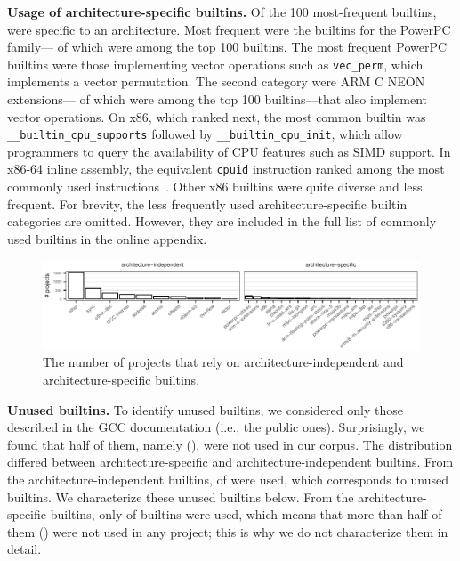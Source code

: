 \documentclass[sigconf,screen]{acmart}
\renewcommand{\paragraph}[1]{\textbf{#1}}
\newcommand\code[1]{\texttt{#1}}
\begin{document}
\paragraph{Usage of architecture-specific builtins.}
\sloppy
Of the 100 most-frequent builtins, \topMachineSpecificBuiltins{} were specific to an architecture.
Most frequent were the builtins for the PowerPC family---\topPowerpcAltivecBuiltins{} of which were among the top 100 builtins.
The most frequent PowerPC builtins were those implementing vector operations such as \code{vec\_perm}, which implements a vector permutation.
The second category were ARM C NEON extensions---\topArmCBuiltins{} of which were among the top 100 builtins---that also implement vector operations.
On x86, which ranked next, the most common builtin was \code{\_\_builtin\_cpu\_supports} followed by \code{\_\_builtin\_cpu\_init}, which allow programmers to query the availability of CPU features such as SIMD support.
In x86-64 inline assembly, the equivalent \code{cpuid} instruction ranked among the most commonly used instructions~\cite{inlineassembly}.
Other x86 builtins were quite diverse and less frequent.
For brevity, the less frequently used architecture-specific builtin categories are omitted. However, they are included in the full list of commonly used builtins in the online appendix.

\begin{figure}[tb]
    \centering
    \includegraphics[width=\textwidth]{../generated/plots/platform-dependent-and-independent-in-projects.pdf}
    \caption{The number of projects that rely on architecture-independent and architecture-specific builtins.}
    \label{img:builtinsbarplots}
\end{figure}


\paragraph{Unused builtins.}
To identify unused builtins, we considered only those described in the GCC documentation (i.e., the public ones).
Surprisingly, we found that half of them, namely \numberDefBuiltinsNotUsed{} (\percentageDefBuiltinsNotUsed{}), were not used in our corpus.
The distribution differed between architecture-specific and architecture-independent builtins.
From the architecture-independent builtins, \nrMachineIndependentBuiltinsUsed{} of \nrArchitectureIndependentBuiltins{} were used, which corresponds to \percentageUnusedMachineIndependetBuiltins{} unused builtins.
We characterize these unused builtins below.
From the architecture-specific builtins, only \nrMachineSpecificBuiltinsUsed{} of \nrArchitectureSpecificBuiltins{} builtins were used, which means that more than half of them (\percentageUnusedMachineSpecificBuiltins{}) were not used in any project; this is why we do not characterize them in detail.
\end{document}
